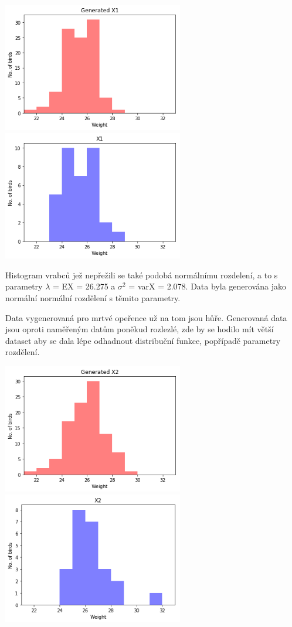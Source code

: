 \documentclass[12pt,a4paper]{article}
\begin{document}
\includegraphics[width=3.1in]{4_Survived_Gen}
\includegraphics[width=3.1in]{4_Survived_Data}

Histogram vrabců jež nepřežili se také podobá normálnímu rozdelení, a to s parametry $\lambda$ = EX = 26.275 a $\sigma ^2$ = varX = 2.078. Data byla generována jako normální normální rozdělení s těmito parametry.

Data vygenerovaná pro mrtvé opeřence už na tom jsou hůře. Generovaná data jsou oproti naměřeným datům poněkud rozlezlé, zde by se hodilo mít větší dataset aby se dala lépe odhadnout distribuční funkce, popřípadě parametry rozdělení.

\includegraphics[width=3.1in]{4_Died_Gen}
\includegraphics[width=3.1in]{4_Died_Data}
\end{document}
